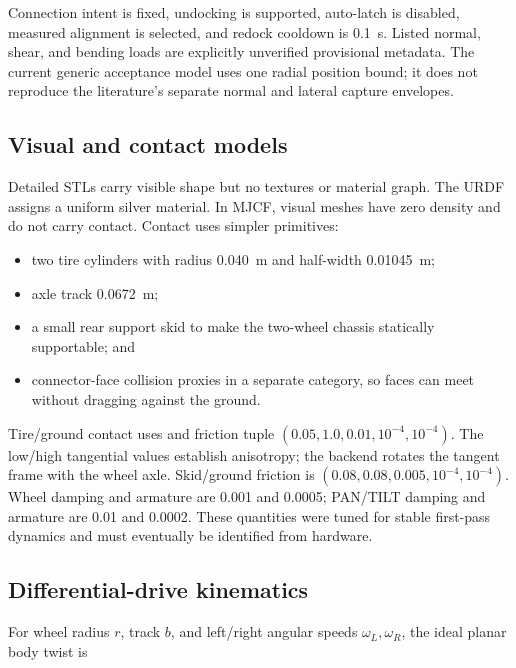 Connection intent is fixed, undocking is supported, auto-latch is disabled, measured
alignment is selected, and redock cooldown is \SI{0.1}{s}. Listed normal, shear, and
bending loads are explicitly unverified provisional metadata. The current generic
acceptance model uses one radial position bound; it does not reproduce the literature's
separate normal and lateral capture envelopes.

\subsection{Visual and contact models}

Detailed STLs carry visible shape but no textures or material graph. The URDF assigns a
uniform silver material. In MJCF, visual meshes have zero density and do not carry
contact. Contact uses simpler primitives:

\begin{itemize}
  \item two tire cylinders with radius \SI{0.040}{m}\cadfact{} and half-width
        \SI{0.01045}{m}\cadfact{};
  \item axle track \SI{0.0672}{m}\cadfact{};
  \item a small rear support skid\simchoice{} to make the two-wheel chassis statically
        supportable; and
  \item connector-face collision proxies in a separate category, so faces can meet
        without dragging against the ground.
\end{itemize}

Tire/ground contact uses  and friction tuple
$(0.05,1.0,0.01,10^{-4},10^{-4})$\simchoice{}. The low/high tangential values establish
anisotropy; the backend rotates the tangent frame with the wheel axle. Skid/ground
friction is $(0.08,0.08,0.005,10^{-4},10^{-4})$\simchoice{}. Wheel damping and armature
are \num{0.001} and \num{0.0005}; PAN/TILT damping and armature are \num{0.01} and
\num{0.0002}\simchoice{}. These quantities were tuned for stable first-pass dynamics and
must eventually be identified from hardware.

\subsection{Differential-drive kinematics}

For wheel radius $r$, track $b$, and left/right angular speeds
$\omega_L,\omega_R$, the ideal planar body twist is

